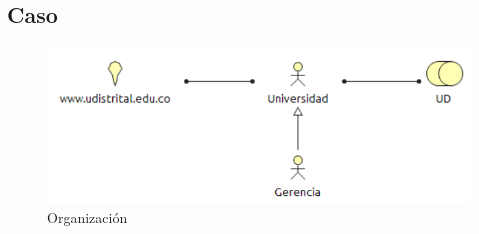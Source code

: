 \subsection{Caso}
\begin{figure}[th!]
	\centering
	\includegraphics[width=0.8\linewidth]{arquitectura_diseno/imgs/C_Organizacion}
	\caption{Organización}
\end{figure}